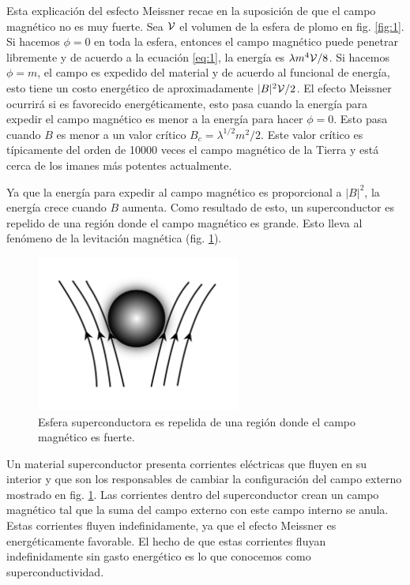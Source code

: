 Esta explicación del esfecto Meissner recae en la suposición de que el campo magnético no es muy fuerte. Sea $\mathcal{V}$ el volumen de la esfera de plomo en fig. \ref{fig:1}. Si hacemos $\phi=0$ en toda la esfera, entonces el campo magnético puede penetrar libremente y de acuerdo a la ecuación \eqref{eq:1}, la energía es $\lambda m^4\mathcal{V}/8$. Si hacemos $\phi=m$, el campo es expedido del material y de acuerdo al funcional de energía, esto tiene un costo energético de aproximadamente $|B|^2\mathcal{V}/2$. El efecto Meissner ocurrirá si es favorecido energéticamente, esto pasa cuando la energía para expedir el campo magnético es menor a la energía para hacer $\phi=0$. Esto pasa cuando $B$ es menor a un valor crítico $B_{c}=\lambda^{1/2}m^2/2$. Este valor crítico es típicamente del orden de 10000 veces el campo magnético de la Tierra y está cerca de los imanes más potentes actualmente.

Ya que la energía para expedir al campo magnético es proporcional a $|B|^2$, la energía crece cuando $B$ aumenta. Como resultado de esto, un superconductor es repelido de una región donde el campo magnético es grande. Esto lleva al fenómeno de la levitación magnética (fig. \ref{fig:2}).

\begin{figure}[ht]
	\centering
	\includegraphics[width=0.6\textwidth]{gfx/maglev.png}
	\caption{Esfera superconductora es repelida de una región donde el campo magnético es fuerte.}
	\label{fig:2}
\end{figure}

Un material superconductor presenta corrientes eléctricas que fluyen en su interior y que son los responsables de cambiar la configuración del campo externo mostrado en fig. \ref{fig:2}. Las corrientes dentro del superconductor crean un campo magnético tal que la suma del campo externo con este campo interno se anula. Estas corrientes fluyen indefinidamente, ya que el efecto Meissner es energéticamente favorable. El hecho de que estas corrientes fluyan indefinidamente sin gasto energético es lo que conocemos como superconductividad.

